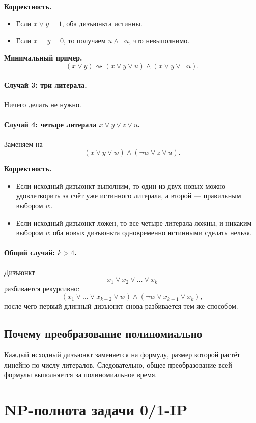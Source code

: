 \documentclass[12pt,a4paper]{article}
\theoremstyle{definition}
\theoremstyle{plain}
\begin{document}
\textbf{Корректность.}
\begin{itemize}
\item Если $x\vee y=1$, оба дизъюнкта истинны.
\item Если $x=y=0$, то получаем $u\wedge\neg u$, что невыполнимо.
\end{itemize}

\textbf{Минимальный пример.}
\[
(x\vee y)\rightsquigarrow (x\vee y\vee u)\wedge(x\vee y\vee \neg u).
\]

\paragraph{Случай 3: три литерала.}
Ничего делать не нужно.

\paragraph{Случай 4: четыре литерала $x\vee y\vee z\vee u$.}
Заменяем на
\[
(x\vee y\vee w)\wedge(\neg w\vee z\vee u).
\]

\textbf{Корректность.}
\begin{itemize}
\item Если исходный дизъюнкт выполним, то один из двух новых можно удовлетворить за счёт уже истинного литерала, а второй --- правильным выбором $w$.
\item Если исходный дизъюнкт ложен, то все четыре литерала ложны, и никаким выбором $w$ оба новых дизъюнкта одновременно истинными сделать нельзя.
\end{itemize}

\paragraph{Общий случай: $k>4$.}
Дизъюнкт
\[
x_1\vee x_2\vee \dots \vee x_k
\]
разбивается рекурсивно:
\[
(x_1\vee \dots \vee x_{k-2}\vee w)\wedge(\neg w\vee x_{k-1}\vee x_k),
\]
после чего первый длинный дизъюнкт снова разбивается тем же способом.

\subsection{Почему преобразование полиномиально}
Каждый исходный дизъюнкт заменяется на формулу, размер которой растёт линейно по числу литералов. Следовательно, общее преобразование всей формулы выполняется за полиномиальное время.

\section{NP-полнота задачи \texorpdfstring{\textsc{0/1-IP}}{0/1-IP}}
\end{document}
